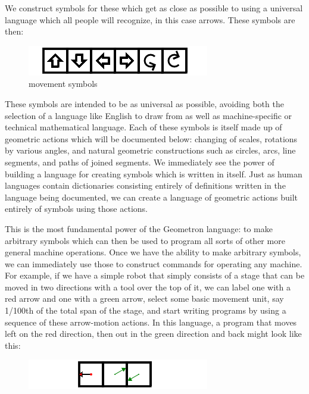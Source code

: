 \documentclass[12pt,a4paper]{amsart}
\numberwithin{equation}{section}
\begin{document}
We construct symbols for these which get as close as possible to using a
universal language which all people will recognize, in this case arrows.
These symbols are then:

\begin{figure}[htbp]
\centering
\includegraphics{figures/movements-symbols.png}
\caption{movement symbols}
\end{figure}

These symbols are intended to be as universal as possible, avoiding both
the selection of a language like English to draw from as well as
machine-specific or technical mathematical language. Each of these
symbols is itself made up of geometric actions which will be documented
below: changing of scales, rotations by various angles, and natural
geometric constructions such as circles, arcs, line segments, and paths
of joined segments. We immediately see the power of building a language
for creating symbols which is written in itself. Just as human languages
contain dictionaries consisting entirely of definitions written in the
language being documented, we can create a language of geometric actions
built entirely of symbols using those actions.

This is the most fundamental power of the Geometron language: to make
arbitrary symbols which can then be used to program all sorts of other
more general machine operations. Once we have the ability to make
arbitrary symbols, we can immediately use those to construct commands
for operating any machine. For example, if we have a simple robot that
simply consists of a stage that can be moved in two directions with a
tool over the top of it, we can label one with a red arrow and one with
a green arrow, select some basic movement unit, say 1/100th of the total
span of the stage, and start writing programs by using a sequence of
these arrow-motion actions. In this language, a program that moves left
on the red direction, then out in the green direction and back might
look like this:

\begin{figure}[htbp]
\centering
\includegraphics{figures/robot-movements.png}
\caption{}
\end{figure}
\end{document}
